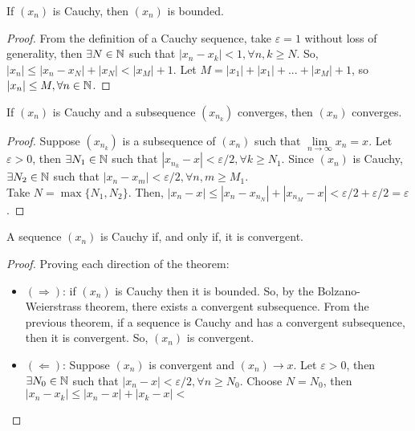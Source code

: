 \begin{theorem}
    If $(x_n)$ is Cauchy, then $(x_n)$ is bounded.
\end{theorem}

\begin{proof}
    From the definition of a Cauchy sequence, take $\varepsilon=1$ without loss of generality, then $\exists N \in \mathbb{N}$ such that $|x_n-x_k| < 1, \forall n, k \geq N$. So, $|x_n| \leq |x_n - x_N| + |x_N| < |x_M| + 1$. Let $M = |x_1| + |x_1| + ... + |x_M| + 1$, so $|x_n| \leq M, \forall n \in \mathbb{N}$.
\end{proof}

\begin{theorem}
    If $(x_n)$ is Cauchy and a subsequence $(x_{n_k})$ converges, then $(x_n)$ converges.
\end{theorem}

\begin{proof}
    Suppose $(x_{n_k})$ is a subsequence of $(x_n)$ such that $\lim \limits_{n \to \infty} x_n = x$. Let $\varepsilon > 0$, then $\exists N_1 \in \mathbb{N}$ such that $|x_{n_k} - x| < \varepsilon/2, \forall k \geq N_1$. Since $(x_n)$ is Cauchy, $\exists N_2 \in \mathbb{N}$ such that $|x_n-x_m| < \varepsilon/2, \forall n, m \geq M_1$.\\
    Take $N = \max \{N_1, N_2\}$. Then, $|x_n-x| \leq |x_n-x_{n_N}| + |x_{n_M} - x| < \varepsilon/2  + \varepsilon/2 = \varepsilon$.
\end{proof}

\begin{theorem}
    A sequence $(x_n)$ is Cauchy if, and only if, it is convergent.
\end{theorem}

\begin{proof}
    Proving each direction of the theorem:
    \begin{itemize}
        \item $(\Longrightarrow)$: if $(x_n)$ is Cauchy then it is bounded. So, by the Bolzano-Weierstrass theorem, there exists a convergent subsequence. From the previous theorem, if a sequence is Cauchy and has a convergent subsequence, then it is convergent. So, $(x_n)$ is convergent.
        \item $(\Longleftarrow)$: Suppose $(x_n)$ is convergent and $(x_n) \to x$. Let $\varepsilon > 0$, then $\exists N_0 \in \mathbb{N}$ such that $|x_n - x| < \varepsilon/2, \forall n \geq N_0$. Choose $N = N_0$, then $|x_n-x_k| \leq |x_n-x| + |x_k-x| < $
    \end{itemize}
\end{proof}

